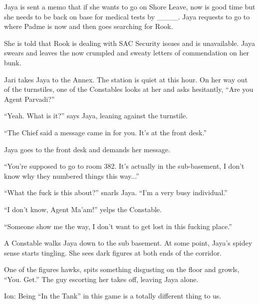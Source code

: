 
Jaya is sent a memo that if she wants to go on Shore Leave, now is good time but she needs to be back on base for medical tests by \_\_\_\_.  Jaya requests to go to where Padme is now and then goes searching for Rook.

She is told that Rook is dealing with SAC Security issues and is unavailable.  Jaya swears and leaves the now crumpled and sweaty letters of commendation on her bunk.



Jari takes Jaya to the Annex. The station is quiet at this hour. On her way out of the turnstiles, one of the Constables looks at her and asks hesitantly, ``Are you Agent Parvadi?''

``Yeah.  What is it?'' says Jaya, leaning against the turnstile. 

``The Chief said a message came in for you.  It's at the front desk.''

Jaya goes to the front desk and demands her message.

``You're supposed to go to room 382.  It's actually in the sub-basement, I don't know why they numbered things this way...''

``What the fuck is this about?'' snarls Jaya.  ``I'm a very busy individual.''

``I don't know, Agent Ma'am!'' yelps the Constable.

``Someone show me the way, I don't want to get lost in this fucking place.''

A Constable walks Jaya down to the sub basement.  At some point, Jaya's spidey sense starts tingling.  She sees dark figures at both ends of the corridor.

One of the figures hawks, spits something disgusting on the floor and growls, ``You.  Get.'' The guy escorting her takes off, leaving Jaya alone.








Ion: Being ``In the Tank'' in this game is a totally different thing to us.\\[4mm]



